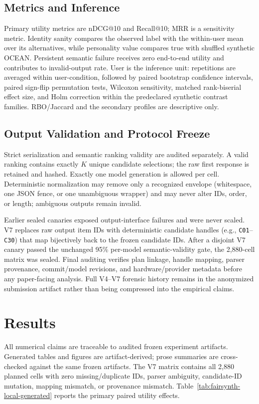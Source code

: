 \documentclass[runningheads]{llncs}
\begin{document}
\subsection{Metrics and Inference}
Primary utility metrics are nDCG@10 and Recall@10; MRR is a sensitivity metric. Identity sanity compares the observed label with the within-user mean over its alternatives, while personality value compares true with shuffled synthetic OCEAN. Persistent semantic failure receives zero end-to-end utility and contributes to invalid-output rate. User is the inference unit: repetitions are averaged within user-condition, followed by paired bootstrap confidence intervals, paired sign-flip permutation tests, Wilcoxon sensitivity, matched rank-biserial effect size, and Holm correction within the predeclared synthetic contrast families. RBO/Jaccard and the secondary profiles are descriptive only.

\subsection{Output Validation and Protocol Freeze}
Strict serialization and semantic ranking validity are audited separately. A valid ranking contains exactly $K$ unique candidate selections; the raw first response is retained and hashed. Exactly one model generation is allowed per cell. Deterministic normalization may remove only a recognized envelope (whitespace, one JSON fence, or one unambiguous wrapper) and may never alter IDs, order, or length; ambiguous outputs remain invalid.

Earlier sealed canaries exposed output-interface failures and were never scaled. V7 replaces raw output item IDs with deterministic candidate handles (e.g., \texttt{C01}--\texttt{C30}) that map bijectively back to the frozen candidate IDs. After a disjoint V7 canary passed the unchanged 95\% per-model semantic-validity gate, the 2,880-cell matrix was sealed. Final auditing verifies plan linkage, handle mapping, parser provenance, commit/model revisions, and hardware/provider metadata before any paper-facing analysis. Full V4--V7 forensic history remains in the anonymized submission artifact rather than being compressed into the empirical claims.

\section{Results}
All numerical claims are traceable to audited frozen experiment artifacts. Generated tables and figures are artifact-derived; prose summaries are cross-checked against the same frozen artifacts. The V7 matrix contains all 2,880 planned cells with zero missing/duplicate IDs, parser ambiguity, candidate-ID mutation, mapping mismatch, or provenance mismatch. Table~\ref{tab:fairsynth-local-generated} reports the primary paired utility effects.
\end{document}
